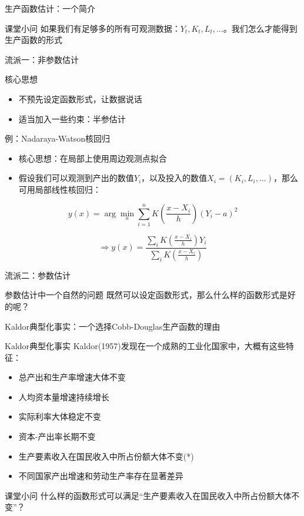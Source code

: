 \documentclass[aspectratio=32]{beamer}
\begin{document}
\begin{frame}{生产函数估计：一个简介}
\begin{block}{课堂小问}
如果我们有足够多的所有可观测数据：\(Y_t,K_t,L_t,\ldots\)。我们怎么才能得到生产函数的形式
\end{block}
\end{frame}

\begin{frame}{流派一：非参数估计}
\begin{block}{核心思想}
\begin{itemize}
    \item 不预先设定函数形式，让数据说话
    \item 适当加入一些约束：半参估计
\end{itemize}
\end{block}

\begin{block}{例：Nadaraya-Watson核回归}
\begin{itemize}
    \item 核心思想：在局部上使用周边观测点拟合
    \item 假设我们可以观测到产出的数值\(Y_i\)，以及投入的数值\(X_i=(K_i,L_i,\ldots)\)，那么可用局部线性核回归：
\end{itemize}
\end{block}
\[
y\left(x\right)=\arg\min_{a}\sum_{i=1}^{n}K\left(\frac{x-X_i}{h}\right)\left(Y_i-a\right)^2
\]

\[
\Longrightarrow y\left(x\right)=\frac{\sum_{i}K\left(\frac{x-X_i}{h}\right)Y_i}{\sum_{i}K\left(\frac{x-X_i}{h}\right)}
\]
\end{frame}

\begin{frame}{流派二：参数估计}
\begin{block}{参数估计中一个自然的问题}
既然可以设定函数形式，那么什么样的函数形式是好的呢？
\end{block}
\end{frame}

\begin{frame}{Kaldor典型化事实：一个选择Cobb-Douglas生产函数的理由}
\begin{block}{Kaldor典型化事实}
Kaldor(1957)发现在一个成熟的工业化国家中，大概有这些特征：
\begin{itemize}
    \item 总产出和生产率增速大体不变
    \item 人均资本量增速持续增长
    \item 实际利率大体稳定不变
    \item 资本-产出率长期不变
    \item 生产要素收入在国民收入中所占份额大体不变(*)
    \item 不同国家产出增速和劳动生产率存在显著差异
\end{itemize}
\end{block}

\begin{block}{课堂小问}
什么样的函数形式可以满足“生产要素收入在国民收入中所占份额大体不变”？
\end{block}
\end{frame}
\end{document}
